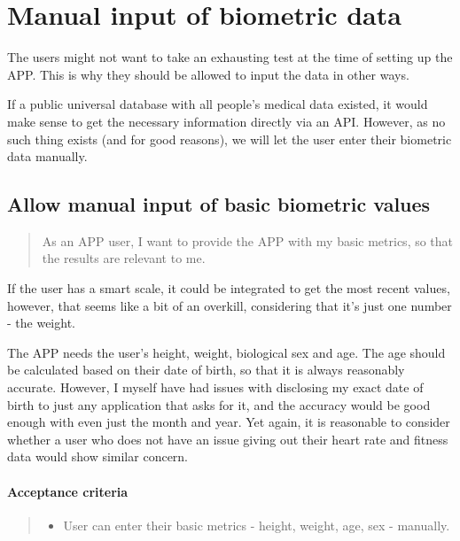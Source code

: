 \section{Manual input of biometric data}\label{epic:manual}

The users might not want to take an exhausting test at the time of setting up the APP.
This is why they should be allowed to input the data in other ways.

If a public universal database with all people's medical data existed, it would make sense to get the necessary information directly via an API.
However, as no such thing exists (and for good reasons), we will let the user enter their biometric data manually.

\subsection{Allow manual input of basic biometric values}\label{US:manual-basic}
\begin{quote}
As an APP user, I want to provide the APP with my basic metrics, so that the results are relevant to me.
\end{quote}

If the user has a smart scale, it could be integrated to get the most recent values, however, that seems like a bit of an overkill, considering that it's just one number - the weight.

The APP needs the user's height, weight, biological sex and age.
The age should be calculated based on their date of birth, so that it is always reasonably accurate.
However, I myself have had issues with disclosing my exact date of birth to just any application that asks for it, and the accuracy would be good enough with even just the month and year.
Yet again, it is reasonable to consider whether a user who does not have an issue giving out their heart rate and fitness data would show similar concern.

\paragraph*{Acceptance criteria}
\begin{quote}
\begin{itemize}
    \item User can enter their basic metrics - height, weight, age, sex - manually.
\end{itemize}
\end{quote}

